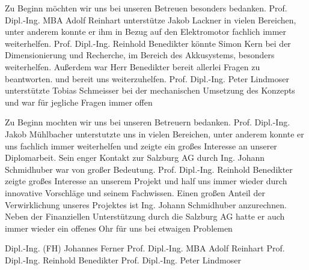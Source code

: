 Zu Beginn möchten wir uns bei unseren Betreuen besonders bedanken. Prof. Dipl.-Ing. MBA Adolf Reinhart unterstütze Jakob Lackner in vielen Bereichen, unter anderem konnte er ihm in Bezug auf den Elektromotor fachlich immer weiterhelfen. Prof. Dipl.-Ing. Reinhold Benedikter könnte Simon Kern bei der Dimensionierung und Recherche, im Bereich des Akkusystems, besonders weiterhelfen. Außerdem war Herr Benedikter bereit allerlei Fragen zu beantworten. und bereit uns weiterzuhelfen. Prof. Dipl.-Ing. Peter Lindmoser unterstützte Tobias Schmeisser bei der mechanischen Umsetzung des Konzepts und war für jegliche Fragen immer offen

Zu Beginn mochten wir uns bei unseren Betreuern bedanken. Prof. Dipl.-Ing. Jakob Mühlbacher
unterstutzte uns in vielen Bereichen, unter anderem konnte er uns fachlich immer weiterhelfen
und zeigte ein großes Interesse an unserer Diplomarbeit. Sein enger Kontakt zur Salzburg AG
durch Ing. Johann Schmidhuber war von großer Bedeutung.
Prof. Dipl.-Ing. Reinhold Benedikter zeigte großes Interesse an unserem Projekt und half uns
immer wieder durch innovative Vorschläge und seinem Fachwissen.
Einen großen Anteil der Verwirklichung unseres Projektes ist Ing. Johann Schmidhuber anzurechnen. Neben der Finanziellen Unterstützung durch die Salzburg AG hatte er auch immer wieder
ein offenes Ohr für uns bei etwaigen Problemen

Dipl.-Ing. (FH) Johannes Ferner
Prof. Dipl.-Ing. MBA Adolf Reinhart
Prof. Dipl.-Ing. Reinhold Benedikter
Prof. Dipl.-Ing. Peter Lindmoser


\newpage
\thispagestyle{empty}
\mbox{}
\newpage




